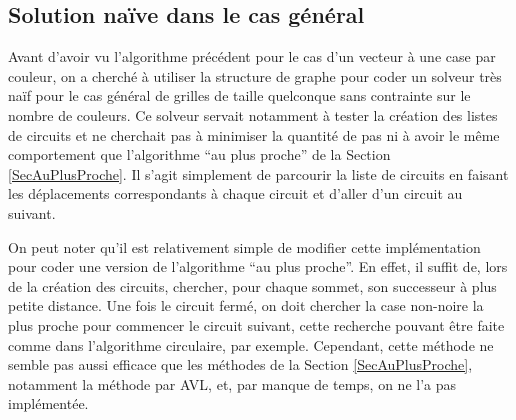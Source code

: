 \documentclass[a4paper,12pt]{article}
\numberwithin{equation}{section}
\begin{document}
\subsection{Solution naïve dans le cas général}

Avant d'avoir vu l'algorithme précédent pour le cas d'un vecteur à une case par couleur, on a cherché à utiliser la structure de graphe pour coder un solveur très naïf pour le cas général de grilles de taille quelconque sans contrainte sur le nombre de couleurs. Ce solveur servait notamment à tester la création des listes de circuits et ne cherchait pas à minimiser la quantité de pas ni à avoir le même comportement que l'algorithme ``au plus proche'' de la Section \ref{SecAuPlusProche}. Il s'agit simplement de parcourir la liste de circuits en faisant les déplacements correspondants à chaque circuit et d'aller d'un circuit au suivant.

On peut noter qu'il est relativement simple de modifier cette implémentation pour coder une version de l'algorithme ``au plus proche''. En effet, il suffit de, lors de la création des circuits, chercher, pour chaque sommet, son successeur à plus petite distance. Une fois le circuit fermé, on doit chercher la case non-noire la plus proche pour commencer le circuit suivant, cette recherche pouvant être faite comme dans l'algorithme circulaire, par exemple. Cependant, cette méthode ne semble pas aussi efficace que les méthodes de la Section \ref{SecAuPlusProche}, notamment la méthode par AVL, et, par manque de temps, on ne l'a pas implémentée.
\end{document}

